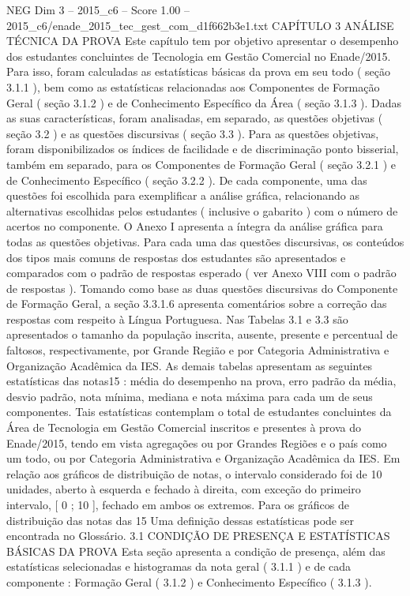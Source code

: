 \begin{textsample}{NEG Dim 3 – 2015\_c6 – Score 1.00 – 2015\_c6/enade\_2015\_tec\_gest\_com\_d1f662b3e1.txt}  \label{ex:f3_neg_069}
CAPÍTULO 3 ANÁLISE TÉCNICA DA PROVA Este capítulo tem por objetivo apresentar o desempenho dos estudantes concluintes de Tecnologia em Gestão Comercial no Enade/2015.
Para isso, foram calculadas as estatísticas básicas da prova em seu todo ( seção 3.1.1 ), bem como as estatísticas relacionadas aos Componentes de Formação Geral ( seção 3.1.2 ) e de Conhecimento Específico da Área ( seção 3.1.3 ).
Dadas as suas características, foram analisadas, em separado, as questões objetivas ( seção 3.2 ) e as questões discursivas ( seção 3.3 ).
Para as questões objetivas, foram disponibilizados os índices de facilidade e de discriminação ponto bisserial, também em separado, para os Componentes de Formação Geral ( seção 3.2.1 ) e de Conhecimento Específico ( seção 3.2.2 ).
De cada componente, uma das questões foi escolhida para exemplificar a análise gráfica, relacionando as alternativas escolhidas pelos estudantes ( inclusive o gabarito ) com o número de acertos no componente.
O Anexo I apresenta a íntegra da análise gráfica para todas as questões objetivas.
Para cada uma das questões discursivas, os conteúdos dos tipos mais comuns de respostas dos estudantes são apresentados e comparados com o padrão de respostas esperado ( ver Anexo VIII com o padrão de respostas ).
Tomando como base as duas questões discursivas do Componente de Formação Geral, a seção 3.3.1.6 apresenta comentários sobre a correção das respostas com respeito à Língua Portuguesa.
Nas Tabelas 3.1 e 3.3 são apresentados o tamanho da população inscrita, ausente, presente e percentual de faltosos, respectivamente, por Grande Região e por Categoria Administrativa e Organização Acadêmica da IES.
As demais tabelas apresentam as seguintes estatísticas das notas15 : média do desempenho na prova, erro padrão da média, desvio padrão, nota mínima, mediana e nota máxima para cada um de seus componentes.
Tais estatísticas contemplam o total de estudantes concluintes da Área de Tecnologia em Gestão Comercial inscritos e presentes à prova do Enade/2015, tendo em vista agregações ou por Grandes Regiões e o país como um todo, ou por Categoria Administrativa e Organização Acadêmica da IES.
Em relação aos gráficos de distribuição de notas, o intervalo considerado foi de 10 unidades, aberto à esquerda e fechado à direita, com exceção do primeiro intervalo, [ 0 ; 10 ], fechado em ambos os extremos.
Para os gráficos de distribuição das notas das 15 Uma definição dessas estatísticas pode ser encontrada no Glossário. 3.1 CONDIÇÃO DE PRESENÇA E ESTATÍSTICAS BÁSICAS DA PROVA Esta seção apresenta a condição de presença, além das estatísticas selecionadas e histogramas da nota geral ( 3.1.1 ) e de cada componente : Formação Geral ( 3.1.2 ) e Conhecimento Específico ( 3.1.3 ).

\end{textsample}
